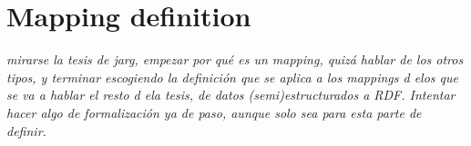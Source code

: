 \section{Mapping definition}
\label{sec:ch4_mapping_def}

\textit{mirarse la tesis de jarg, empezar por qué es un mapping, quizá hablar de los otros tipos, y terminar escogiendo la definición que se aplica a los mappings d elos que se va a hablar el resto d ela tesis, de datos (semi)estructurados a RDF. Intentar hacer algo de formalización ya de paso, aunque solo sea para esta parte de definir. }